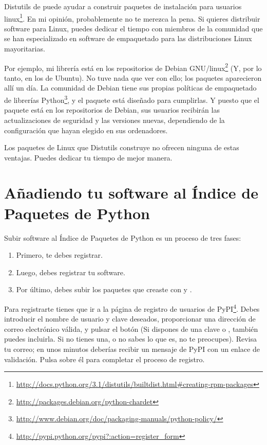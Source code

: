 {Distutils de puede ayudar a construir paquetes de instalación para usuarios linux\footnote{\href{http://docs.python.org/3.1/distutils/builtdist.html\#creating-rpm-packages}{http://docs.python.org/3.1/distutils/builtdist.html\#creating-rpm-packages}}. En mi opinión, probablemente no te merezca la pena. Si quieres distribuir software para Linux, puedes dedicar el tiempo con miembros de la comunidad que se han especializado en software de empaquetado para las distribuciones Linux mayoritarias.

Por ejemplo, mi librería  está en los repositorios de Debian GNU/linux\footnote{\href{http://packages.debian.org/python-chardet}{http://packages.debian.org/python-chardet}} (Y, por lo tanto, en los de Ubuntu). No tuve nada que ver con ello; los paquetes aparecieron allí un día. La comunidad de Debian tiene sus propias políticas de empaquetado de librerías Python\footnote{\href{http://www.debian.org/doc/packaging-manuals/python-policy/}{http://www.debian.org/doc/packaging-manuals/python-policy/}}, y el paquete  está diseñado para cumplirlas. Y puesto que el paquete está en los repositorios de Debian, sus usuarios recibirán las actualizaciones de seguridad y las versiones nuevas, dependiendo de la configuración que hayan elegido en sus ordenadores.

Los paquetes de Linux que Distutils construye no ofrecen ninguna de estas ventajas. Puedes dedicar tu tiempo de mejor manera.

\section{Añadiendo tu software al Índice de Paquetes de Python}

Subir software al Índice de Paquetes de Python es un proceso de tres fases:

\begin{enumerate}
  \item Primero, te debes registrar.
  \item Luego, debes registrar tu software.
  \item Por último, debes subir los paquetes que creaste con  y .
\end{enumerate}

Para registrarte tienes que ir a la página de registro de usuarios de PyPI\footnote{\href{http://pypi.python.org/pypi?:action=register\_form}{http://pypi.python.org/pypi?:action=register\_form}}. Debes introducir el nombre de usuario y clave deseados, proporcionar una dirección de correo electrónico válida, y pulsar el botón  (Si dispones de una clave  o , también puedes incluirla. Si no tienes una, o no sabes lo que es, no te preocupes). Revisa tu correo; en unos minutos deberías recibir un mensaje de PyPI con un enlace de validación. Pulsa sobre él para completar el proceso de registro.

}
